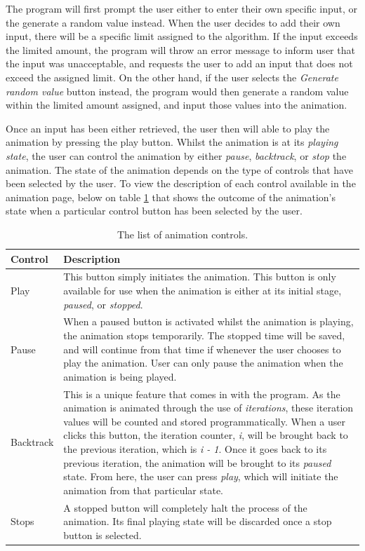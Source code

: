 The program will first prompt the user either to enter their own specific input, or the generate a random value instead. When the user decides to add their own input, there will be a specific limit assigned to the algorithm. If the input exceeds the limited amount, the program will throw an error message to inform user that the input was unacceptable, and requests the user to add an input that does not exceed the assigned limit. On the other hand, if the user selects the \textit{Generate random value} button instead, the program would then generate a random value within the limited amount assigned, and input those values into the animation.

Once an input has been either retrieved, the user then will able to play the animation by pressing the play button. Whilst the animation is at its \textit{playing state}, the user can control the animation by either \textit{pause}, \textit{backtrack}, or \textit{stop} the animation. The state of the animation depends on the type of controls that have been selected by the user. To view the description of each control available in the animation page, below on table \ref{tab:animationControls} that shows the outcome of the animation's state when a particular control button has been selected by the user.

\begin{table}[H]
\caption{The list of animation controls.}
\begin{center}
\begin{tabular}{| p{4cm} | p{11cm} |}
		\hline
		\textbf{Control} & \textbf{Description} \\ \hline
		Play & This button simply initiates the animation. This button is only available for use when the animation is either at its initial stage, \textit{paused}, or \textit{stopped}. \\ \hline
     Pause & When a paused button is activated whilst the animation is playing, the animation stops temporarily. The stopped time will be saved, and will continue from that time if whenever the user chooses to play the animation. User can only pause the animation when the animation is being played. \\ \hline
     Backtrack &  This is a unique feature that comes in with the program. As the animation is animated through the use of \textit{iterations}, these iteration values will be counted and stored programmatically. When a user clicks this button, the iteration counter, \textit{i}, will be brought back to the previous iteration, which is \textit{i - 1}. Once it goes back to its previous iteration, the animation will be brought to its \textit{paused} state. From here, the user can press \textit{play}, which will initiate the animation from that particular state. \\ \hline
     Stops &  A stopped button will completely halt the process of the animation. Its final playing state will be discarded once a stop button is selected. \\ \hline
\end{tabular}
\end{center}
\label{tab:animationControls}
\end{table}

